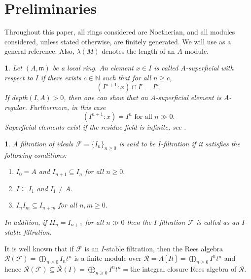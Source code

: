 \documentclass[11pt]{amsart}
\theoremstyle{plain}
\newtheorem{point}[theorem]{}
\newcommand{\m}{\mathfrak{m}}
\newcommand{\R}{\mathcal{R}}
\newcommand{\F}{\mathcal{F}}
\newcommand{\N}{\mathbb{N}}
\theoremstyle{plain}
\begin{document}
\section{Preliminaries}
Throughout this paper, all rings considered are Noetherian, and all modules considered, unless stated otherwise, are finitely generated. We will use \cite{Bruns} as a general reference.
Also, $\lambda(M)$ denotes the length of an $A$-module.
\begin{point}
 \normalfont
 Let $(A, \m)$ be a local ring.
   An element $x\in  I$ is called $A$-superficial with respect to $I$ if there exists $c\in \N$ such that for all $n \geq c$, $$(I^{n+1}:x)\cap I^c = I^n.$$ If depth$(I, A)>0$, then one can show that an $A$-superficial element is $A$-regular. Furthermore, in this case $$(I^{n+1}:x) = I^n \text{ for all } n\gg0.$$ Superficial elements exist if the residue field is infinite, see \cite[Page 86]{hccmm}.
\end{point}

\begin{point}\label{finitm}
\normalfont
 A filtration of ideals $\F=\{I_n\}_{n\geq 0}$ is said to be $I$-filtration if it satisfies the following conditions:
 \begin{enumerate}
     \item $I_0=A$ and $I_{n+1}\subseteq I_n$ for all $n\geq 0.$
     \item $I\subseteq I_1$ and $I_1\neq A.$
     \item $I_nI_m\subseteq I_{n+m}$ for all $n,m\geq 0$.
 \end{enumerate}
 In addition, if $II_n=I_{n+1}$ for all $n\gg0$ then the $I$-filtration $\F$ is called as an $I$-stable filtration.
\end{point}

It is well known that if $\F$ is an $I$-stable filtration, then  the Rees algebra $\R(\F)=\bigoplus_{n\geq 0}I_nt^n$ is a finite module over $\R=A[It]=\bigoplus_{n\geq 0}I^nt^n$ and hence $\R(\F)\subseteq \overline{\R}(I)=\bigoplus_{n\geq 0}\overline{I^n}t^n=$the integral closure Rees algebra of $\R.$
\end{document}
